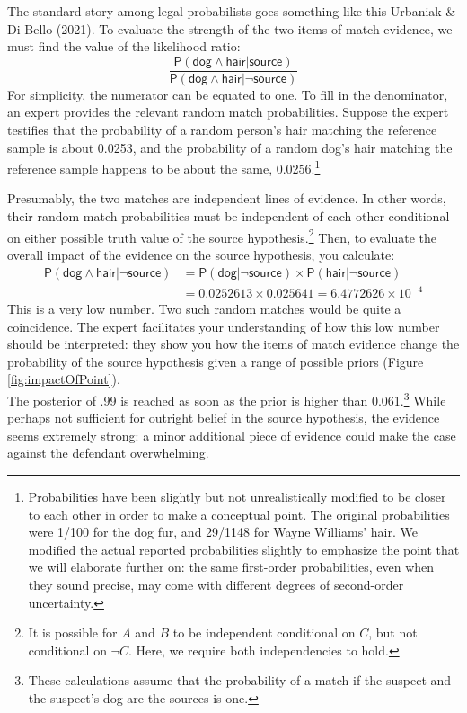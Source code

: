 \documentclass[
  10pt,
  dvipsnames,enabledeprecatedfontcommands]{scrartcl}
\newcommand{\pr}[1]{\mathsf{P}(#1)}
\newcommand{\s}[1]{\mbox{$\mathsf{#1}$}}
\begin{document}
The standard story among legal probabilists goes something like this
Urbaniak \& Di Bello (2021).  To
evaluate the strength of the two items of match evidence, we must find
the value of the likelihood ratio:
\[\frac{\pr{\s{dog}\wedge \s{hair} \vert \s{source}}}{\pr{\s{dog}\wedge \s{hair} \vert \neg \s{source}}}\]
For simplicity, the numerator can be equated to one. To fill in the
denominator, an expert provides the relevant random match probabilities.
Suppose the expert testifies that the probability of a random person's
hair matching the reference sample is about 0.0253, and the probability
of a random dog's hair matching the reference sample happens to be about
the same, 0.0256.\footnote{Probabilities have been slightly but not
  unrealistically modified to be closer to each other in order to make a
  conceptual point. The original probabilities were 1/100 for the dog
  fur, and 29/1148 for Wayne Williams' hair. We modified the actual
  reported probabilities slightly to emphasize the point that we will
  elaborate further on: the same first-order probabilities, even when
  they sound precise, may come with different degrees of second-order
  uncertainty.}

Presumably, the two matches are independent lines of evidence. In other
words, their random match probabilities must be independent of each
other conditional on either possible truth value of the source
hypothesis.\footnote{It is possible for \(A\) and \(B\) to be
  independent conditional on \(C\), but not conditional on \(\neg C\).
  Here, we require both independencies to hold.} Then, to evaluate the
overall impact of the evidence on the source hypothesis, you calculate:
\begin{align*}
\pr{\s{dog}\wedge \s{hair} \vert \neg \s{source}} & = \pr{\s{dog} \vert \neg \s{source}} 
\times \pr{\s{hair} \vert \neg \s{source}} \\
& =  0.0252613 \times  0.025641 = \ensuremath{6.4772626\times 10^{-4}}
\end{align*} This is a very low number. Two such random matches would be
quite a coincidence. The expert facilitates your understanding of how
this low number should be interpreted: they show you how the items of
match evidence change the probability of the source hypothesis given a
range of possible priors (Figure \ref{fig:impactOfPoint}).\\
The posterior of .99 is reached as soon as the prior is higher than
0.061.\footnote{These calculations assume that the probability of a
  match if the suspect and the suspect's dog are the sources is one.}
While perhaps not sufficient for outright belief in the source
hypothesis, the evidence seems extremely strong: a minor additional
piece of evidence could make the case against the defendant
overwhelming.
\end{document}
